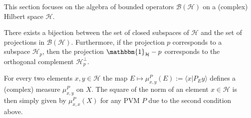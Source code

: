     This section focuses on the algebra of bounded operators $\mathcal{B}(\mathcal{H})$ on a (complex) Hilbert space $\mathcal{H}$.

    \begin{property}
        There exists a bijection between the set of closed subspaces of $\mathcal{H}$ and the set of projections in $\mathcal{B}(\mathcal{H})$. Furthermore, if the projection $p$ corresponds to a subspace $\mathcal{H}_p$, then the projection $\mathbbm{1}_{\mathcal{H}}-p$ corresponds to the orthogonal complement $\mathcal{H}_p^\perp$.
    \end{property}

    \begin{property}
        For every two elements $x,y\in\mathcal{H}$ the map $E\mapsto\mu^P_{x,y}(E):=\langle x|P_Ey\rangle$ defines a (complex) measure $\mu^P_{x, y}$ on $X$. The square of the norm of an element $x\in\mathcal{H}$ is then simply given by $\mu^P_{x,x}(X)$ for any PVM $P$ due to the second condition above.
    \end{property}

